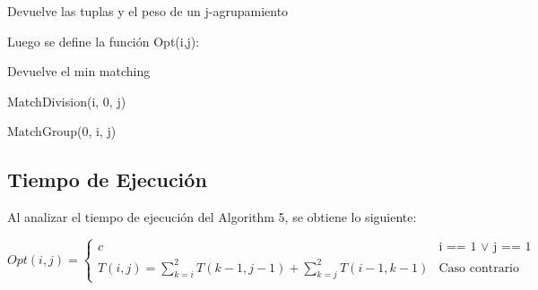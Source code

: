 \documentclass{article}
\begin{document}
\begin{algorithm}
\caption{Devuelve las tuplas y el peso de un j-agrupamiento}
\begin{algorithmic}[1]
    \EndFor
\EndProcedure
\end{algorithmic}
\end{algorithm}

Luego se define la función Opt(i,j):
\newpage
\begin{algorithm}
\caption{Devuelve el min matching}
\begin{algorithmic}[1]
    \State \Return MatchDivision(i, 0, j)
    
    \State  \Return MatchGroup(0, i, j)
    
    \Else
    \EndIf
    \EndFor
    
    \EndIf
    \EndFor
    \EndIf
\EndProcedure

\end{algorithmic}
\end{algorithm}

\subsection{Tiempo de Ejecución}
Al analizar el tiempo de ejecución del Algorithm 5, se obtiene lo siguiente: 

\begin{equation*}
Opt(i,j) =
\begin{cases}
c  & \text{i == 1 $\vee$  j == 1}\\
T(i,j) = \sum^2_{k=i}T(k-1,j-1)+\sum^{2}_{k=j}T(i-1,k-1) & \text{Caso contrario}
\end{cases}
\end{equation*}
\end{document}
